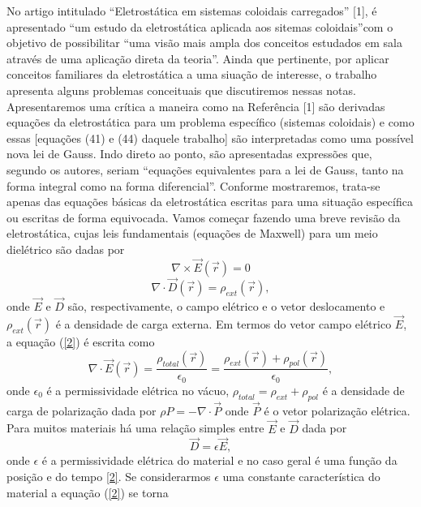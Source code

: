 \documentclass[brazilian,10pt,a4paper]{article}
\begin{document}
\begin{multicols}{2}
No artigo intitulado “Eletrostática em sistemas coloidais carregados” [1], é apresentado “um estudo da
eletrostática aplicada aos sitemas coloidais”com o objetivo de possibilitar “uma visão mais ampla dos conceitos
estudados em sala através de uma aplicação direta da
teoria”. Ainda que pertinente, por aplicar conceitos familiares da eletrostática a uma siuação de interesse, o
trabalho apresenta alguns problemas conceituais que discutiremos nessas notas. Apresentaremos uma crítica a
maneira como na Referência [1] são derivadas equações
da eletrostática para um problema específico (sistemas
coloidais) e como essas [equações (41) e (44) daquele trabalho] são interpretadas como uma possível nova lei de
Gauss. Indo direto ao ponto, são apresentadas expressões
que, segundo os autores, seriam “equações equivalentes
para a lei de Gauss, tanto na forma integral como na
forma diferencial”. Conforme mostraremos, trata-se apenas das equações básicas da eletrostática escritas para
uma situação específica ou escritas de forma equivocada.
Vamos começar fazendo uma breve revisão da eletrostática, cujas leis fundamentais (equações de Maxwell)
para um meio dielétrico são dadas por
\begin{equation}\label{1}
\nabla\times\vec{E}(\vec{r}) = 0
\end{equation}
\begin{equation}\label{2}
\nabla\cdot\vec{D}(\vec{r}) = \rho_{ext}(\vec{r}) , 
\end{equation}
onde $\vec{E}$ e $\vec{D}$ são, respectivamente, o campo elétrico e o vetor deslocamento
e $\rho_{ext}(\vec{r})$ é a densidade de carga externa. Em termos do vetor campo elétrico
$\vec{E}$, a equação (\ref{2}) é escrita como 
\begin{equation}\label{3}
\nabla\cdot\vec{E}(\vec{r})=\frac{\rho_{total}(\vec{r})}{\epsilon_{0}}=\frac{\rho_{ext}(\vec{r})+\rho_{pol}(\vec{r})}{\epsilon_{0}} ,
\end{equation}
onde $\epsilon_{0}$ é a permissividade elétrica no vácuo, $\rho_{total} = \rho_{ext} + \rho_{pol}$ é a densidade de carga de
polarização dada por $\rho P = -\nabla\cdot\vec{P}$ onde $\vec{P}$ é o vetor polarização elétrica. Para muitos materiais há uma
relação simples entre $\vec{E}$ e $\vec{D}$ dada por
\begin{equation}\label{4}
\vec{D} = \epsilon\vec{E} ,
\end{equation}
onde $\epsilon$ é a permissividade elétrica do material e no caso geral é uma função da posição e do tempo \ref{2}. Se considerarmos $\epsilon$ uma constante característica do material a equação (\ref{2}) se torna

\end{multicols}
\end{document}
